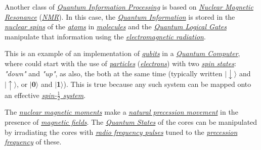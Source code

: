 \documentclass[conference]{IEEEtran}
\begin{document}
\vspace{4pt}

Another class of \href{https://en.wikipedia.org/wiki/Quantum_information_science}{\textit{Quantum Information Processing}} is based on \href{https://en.wikipedia.org/wiki/Nuclear_magnetic_resonance}{\textit{Nuclear Magnetic Resonance}} (\href{https://en.wikipedia.org/wiki/Nuclear_magnetic_resonance}{\textit{NMR}}). In this case, the \href{https://en.wikipedia.org/wiki/Quantum_information}{\textit{Quantum Information}} is stored in the \href{https://en.wikipedia.org/wiki/Spin_(physics)}{\textit{nuclear spins}} of the \href{https://en.wikipedia.org/wiki/Atom}{\textit{atoms}} in \href{https://en.wikipedia.org/wiki/Molecule}{\textit{molecules}} and the \href{https://en.wikipedia.org/wiki/Quantum_logic_gate}{\textit{Quantum Logical Gates}} manipulate that information using the \href{https://en.wikipedia.org/wiki/Electromagnetic_radiation}{\textit{electromagnetic radiation}}.

\vspace{4pt}

This is an example of an implementation of \href{https://en.wikipedia.org/wiki/Qubit}{\textit{qubits}} in a \href{https://en.wikipedia.org/wiki/Quantum_computing}{\textit{Quantum Computer}}, where could start with the use of \href{https://en.wikipedia.org/wiki/Particle}{\textit{particles}} (\href{https://en.wikipedia.org/wiki/Electron}{\textit{electrons}}) with two \href{https://en.wikipedia.org/wiki/Spin_State}{\textit{spin states}}: \textit{"down"} and \textit{"up"}, as also, the both at the same time (typically written \textbf{$\mid\downarrow\rangle$} and \textbf{$\mid\uparrow\rangle$}, or \textbf{$\mid$0$\rangle$} and \textbf{$\mid$1$\rangle$}). This is true because any such system can be mapped onto an effective \href{https://en.wikipedia.org/wiki/Spin-\%C2\%BD}{\textit{spin-$\frac{1}{2}$ system}}.

\vspace{4pt}

The \href{https://en.wikipedia.org/wiki/Nuclear_magnetic_moment}{\textit{nuclear magnetic moments}} make a \href{https://en.wikipedia.org/wiki/Precession}{\textit{natural precession movement}} in the presence of \href{https://en.wikipedia.org/wiki/Magnetic_field}{\textit{magnetic fields}}. The \href{https://en.wikipedia.org/wiki/Quantum_state}{\textit{Quantum States}} of the cores can be manipulated by irradiating the cores with \href{https://en.wikipedia.org/wiki/Radio_frequency}{\textit{radio frequency pulses}} tuned to the \href{https://en.wikipedia.org/wiki/Precession}{\textit{precession frequency}} of these.
\end{document}
